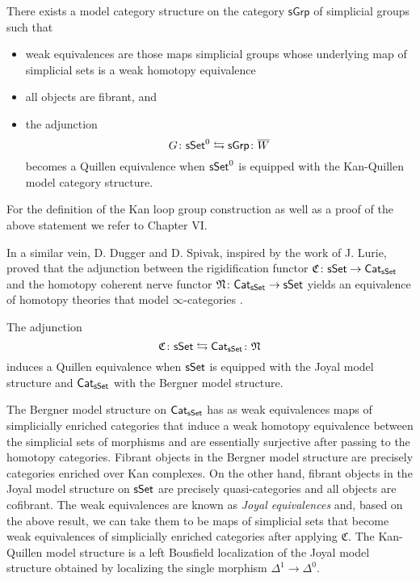 \begin{theorem} \label{kan} There exists a model category structure on the category $\mathsf{sGrp}$ of simplicial groups such that 
\begin{itemize}
    \item weak equivalences are those maps simplicial groups whose underlying map of simplicial sets is a weak homotopy equivalence
    \item all objects are fibrant, and
\item the adjunction
$$G \colon \mathsf{sSet}^0 \leftrightarrows \mathsf{sGrp}\colon \overline{W}$$
becomes a Quillen equivalence when $\mathsf{sSet}^0$ is equipped with the Kan-Quillen model category structure.
\end{itemize}
\end{theorem}

 For the definition of the Kan loop group construction as well as a proof of the above statement we refer to \cite{Goerss-Jardine} Chapter VI. 

In a similar vein, D. Dugger and D. Spivak, inspired by the work of J. Lurie,  proved that the adjunction between the rigidification functor $\mathfrak{C} \colon \mathsf{sSet} \to \mathsf{Cat}_{\mathsf{sSet}}$ and the homotopy coherent nerve functor $\mathfrak{N} \colon \mathsf{Cat}_{\mathsf{sSet}} \to \mathsf{sSet}$ yields an equivalence of homotopy theories that model $\infty$-categories \cite{dugger2011rigidification}.

\begin{theorem} \label{joyalbergner} The adjunction $$ \mathfrak{C} \colon \mathsf{sSet} \leftrightarrows \mathsf{Cat}_{\mathsf{sSet}} \colon \mathfrak{N}$$ induces a Quillen equivalence when $\mathsf{sSet}$ is equipped with the Joyal model structure and $\mathsf{Cat}_{\mathsf{sSet}}$ with the Bergner model structure.
\end{theorem}


\begin{remark} The Bergner model structure on $\mathsf{Cat}_{\mathsf{sSet}}$ has as weak equivalences maps of simplicially enriched categories that induce a weak homotopy equivalence between the simplicial sets of morphisms and are essentially surjective after passing to the homotopy categories. Fibrant objects in the Bergner model structure are precisely categories enriched over Kan complexes. On the other hand, fibrant objects in the Joyal model structure on $\mathsf{sSet}$ are precisely quasi-categories and all objects are cofibrant. The weak equivalences are known as \textit{Joyal equivalences} and, based on the above result, we can take them to be maps of simplicial sets that become weak equivalences of simplicially enriched categories after applying $\mathfrak{C}$. The Kan-Quillen model structure is a left Bousfield localization of the Joyal model structure obtained by localizing the single morphism $\Delta^1 \to \Delta^0.$
\end{remark}



